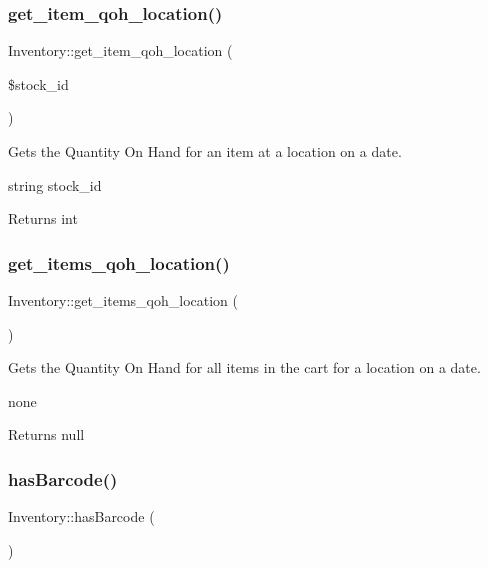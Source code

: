 \subsubsection{\texorpdfstring{get\+\_\+item\+\_\+qoh\+\_\+location()}{get\_item\_qoh\_location()}}
{\footnotesize\ttfamily Inventory\+::get\+\_\+item\+\_\+qoh\+\_\+location (\begin{DoxyParamCaption}\item[{}]{\$stock\+\_\+id }\end{DoxyParamCaption})}

Gets the Quantity On Hand for an item at a location on a date.

string stock\+\_\+id \begin{DoxyReturn}{Returns}
int 
\end{DoxyReturn}
\hypertarget{class_inventory_abe1f31716dc97f457dc66411526cfcc6}{}\label{class_inventory_abe1f31716dc97f457dc66411526cfcc6} 
\subsubsection{\texorpdfstring{get\+\_\+items\+\_\+qoh\+\_\+location()}{get\_items\_qoh\_location()}}
{\footnotesize\ttfamily Inventory\+::get\+\_\+items\+\_\+qoh\+\_\+location (\begin{DoxyParamCaption}{ }\end{DoxyParamCaption})}

Gets the Quantity On Hand for all items in the cart for a location on a date.

none \begin{DoxyReturn}{Returns}
null 
\end{DoxyReturn}
\hypertarget{class_inventory_a5a32d543b372a64b4def7948d4582c9b}{}\label{class_inventory_a5a32d543b372a64b4def7948d4582c9b} 
\subsubsection{\texorpdfstring{has\+Barcode()}{hasBarcode()}}
{\footnotesize\ttfamily Inventory\+::has\+Barcode (\begin{DoxyParamCaption}{ }\end{DoxyParamCaption})}


